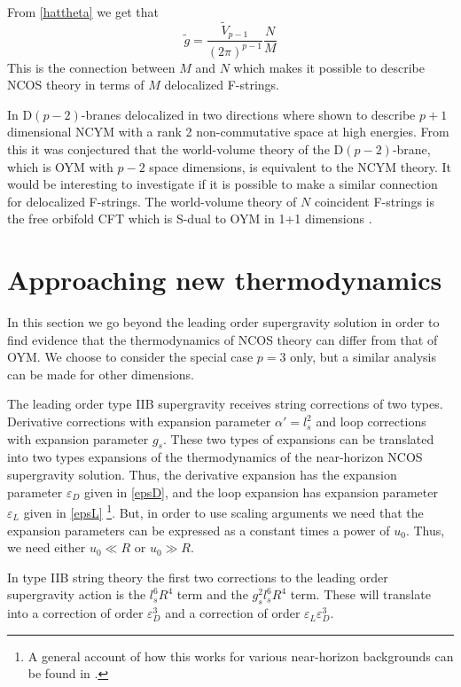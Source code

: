 \documentclass[a4paper,twoside,titlepage,12pt]{article}
\begin{document}
From \eqref{hattheta} we get that 
%
\begin{equation}
\tilde{g} = \frac{\tilde{V}_{p-1}}{(2\pi)^{p-1}} \frac{N}{M}
\end{equation}
%
This is the connection between $M$ and $N$ which makes it possible
to describe NCOS theory in terms of $M$ delocalized F-strings.

In \cite{Lu:1999rm,Cai:2000hn,Youm:2000ub} 
D$(p-2)$-branes delocalized in two directions
where shown to describe $p+1$ dimensional 
NCYM with a rank 2 non-commutative space at high energies.
From this it was conjectured that the world-volume theory 
of the D$(p-2)$-brane, which is OYM with $p-2$ space dimensions,
is equivalent to the NCYM theory.
It would be interesting to investigate if it is possible
to make a similar connection for delocalized F-strings. 
The world-volume theory of $N$ coincident F-strings
is the free orbifold CFT which is S-dual to OYM in 1+1 dimensions
\cite{Dijkgraaf:1997vv}.

\section{Approaching new thermodynamics}
\label{secnewtherm}

In this section we go beyond the leading order supergravity solution
in order to find evidence that the thermodynamics of NCOS theory can differ
from that of OYM. 
We choose to consider the special case $p=3$ only, 
but a similar analysis can be made for other dimensions.

The leading order type IIB supergravity receives string corrections of
two types. Derivative corrections with expansion parameter 
\( \alpha' =l_s^2 \)
and loop corrections with expansion parameter \( g_s \). 
These two types of expansions can be translated into two types 
expansions of the thermodynamics of the 
near-horizon NCOS supergravity solution. 
Thus, the derivative expansion has the expansion parameter 
\( \varepsilon_D \) given in \eqref{epsD}, and the loop expansion
has expansion parameter \( \varepsilon_L \) given in \eqref{epsL}
\footnote{A general account of how this works for various 
near-horizon backgrounds can be found in \cite{Correia:2000}.}.
But, in order to use scaling arguments we need that the expansion
parameters can be expressed as a constant times a power of $u_0$.
Thus, we need either \( u_0 \ll R \) or \( u_0 \gg R \).

In type IIB string theory the first two corrections to the leading
order supergravity action 
is the $l_s^6 R^4$ term and the $g_s^2 l_s^6 R^4$
term. These will translate into a correction of order $\varepsilon_D^3$
and a correction of order $\varepsilon_L \varepsilon_D^3$.
\end{document}
